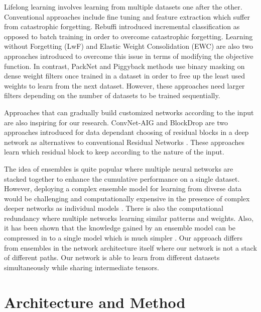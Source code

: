 \documentclass[10pt,twocolumn,letterpaper]{article}
\begin{document}
Lifelong learning involves learning from multiple datasets one after the other. Conventional approaches include fine tuning \cite{fine_tuning} and feature extraction \cite{donahue2014decaf}
which suffer from catastrophic forgetting. Rebuffi \etal \cite{rebuffi2017icarl} introduced incremental classification as opposed to batch training in order to overcome catastrophic forgetting. Learning without Forgetting (LwF) \cite{li2018learning} and Elastic Weight Consolidation (EWC) \cite{ewc} are also two approaches introduced to overcome this issue in terms of modifying the objective function. In contrast, PackNet \cite{packnet} and Piggyback \cite{piggyback} methods use binary masking on dense weight filters once trained in a dataset in order to free up the least used weights to learn from the next dataset. However, these approaches need larger filters depending on the number of datasets to be trained sequentially. 





Approaches that can gradually build customized networks according to the input are also inspiring for our research. ConvNet-AIG \cite{convnet-aig} and BlockDrop \cite{blockdrop} are two approaches introduced for data dependant choosing of residual blocks in a deep network as alternatives to conventional Residual Networks \cite{resnet}. These approaches learn which residual block to keep according to the nature of the input.

The idea of ensembles is quite popular where multiple neural networks are stacked together to enhance the cumulative performance on a single dataset. However, deploying a complex ensemble model for learning from diverse data would be challenging and computationally expensive in the presence of complex deeper networks as individual models \cite{bucilua2006model}. There is also the computational redundancy where multiple networks learning similar patterns and weights. Also, it has been shown that the knowledge gained by an ensemble model can be compressed in to a single model which is much simpler \cite{hinton2015distilling}. Our approach differs from ensembles in the network architecture itself where our network is not a stack of different paths. Our network is able to learn from different datasets simultaneously while sharing intermediate tensors.







\section{Architecture and Method}
\label{se:systemarchitecture}
\vspace{-0.05in}
\end{document}
